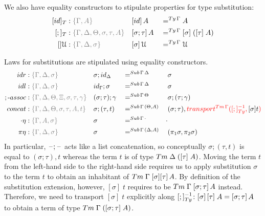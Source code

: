 \documentclass[a4paper,UKenglish,numberwithinsect,cleveref,thm-restate]{lipics-v2021}
\begin{document}
We also have equality constructors to stipulate properties for type substitution:
\begin{alignat*}{3}
  [\idS]_T & : \implicit{\Gamma, A}                               && [ \idS ] \,A         && =^{\Ty\,\Gamma} A \\
  [;]_T    & : \implicit{\Gamma, \Delta, \Theta, \sigma, \tau, A} && [ \sigma ; \tau ]\,A && =^{\Ty\,\Gamma} [ \sigma ]\;([ \tau ]\;A) \\
  []\UU      & : \implicit{\Gamma, \Delta, \sigma}                  && [ \sigma ]\,\UU        && =^{\Ty\,\Gamma} \UU
\end{alignat*}

Laws for substitutions are stipulated using equality constructors.
\begin{alignat*}{5}
  \mathsf{idr}    & : \implicit{\Gamma, \Delta, \sigma} && {\sigma ; \idS_{\Delta}} && =^{\Sub\,\Gamma\,\Delta} && {\sigma} \\
  \mathsf{idl}    & : \implicit{\Gamma, \Delta, \sigma} && {\idS_{\Gamma} ; \sigma} && =^{\Sub\,\Gamma\,\Delta} && {\sigma} \\
  ;\text{-}\mathsf{assoc} & : \implicit{\Gamma, \Delta, \Theta, \Xi, \sigma, \tau, \gamma} && (\sigma ; \tau) ; \gamma && =^{\Sub\,\Gamma\,\Theta} &&  \sigma ; (\tau ; \gamma) \\
  \mathsf{concat} & : \implicit{\Gamma, \Delta, \Theta, \sigma, \tau, A, t} && \sigma ; (\tau , t)      && =^{\Sub\,\Gamma\,(\Theta, A)} &&  (\sigma ; \tau) , \alert{\transfib{\Tm\,\Gamma}{[;]_{\Ty}^{-1}}{\color{black}[ \sigma ] t}} \\
  \emptyctx\eta   & : \implicit{\Gamma, A, \sigma} && \sigma                   && =^{\Sub\,\Gamma\,\emptyctx} & \emptysub \\
  \pi\eta         & : \implicit{\Gamma, \Delta, \sigma} && \sigma                   && =^{\Sub\,\Gamma\,(\Delta, A)} &&  (\pi_1 \sigma, \pi_2 \sigma) \\
\end{alignat*}
In particular, $\mathord{\hspace{1pt}\text{--}\hspace{1pt}};\mathord{\hspace{1pt}\text{--}\hspace{1pt}}$ acts like a list concatenation, so conceptually $\sigma; (\tau, t)$ is equal to $(\sigma; \tau), t$ whereas the term $t$ is of type $\Tm\;\Delta\;([\tau]\;A)$. 
Moving the term $t$ from the left-hand side to the right-hand side requires us to apply substitution $\sigma$ to the term $t$ to obtain an inhabitant of $\Tm\;\Gamma\;[\sigma][\tau]\,A$.
By definition of the substitution extension, however, $[\sigma]\;t$ requires to be $\Tm\;\Gamma\;[\sigma; \tau]\,A$ instead.
Therefore, we need to transport $[\sigma]\;t$ explicitly along $[;]_{\Ty}^{-1}\colon [\sigma]\,[\tau]\;A = [\sigma;\tau]\,A$ to obtain a term of type $\Tm\;\Gamma\;([\sigma;\tau]\;A)$.
\end{document}
